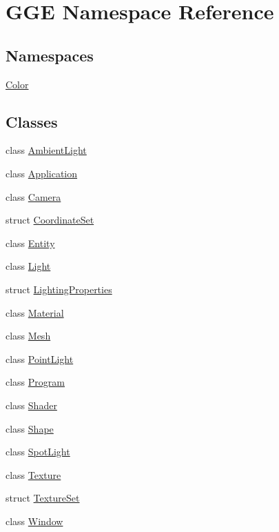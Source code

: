 \hypertarget{namespace_g_g_e}{\section{G\+G\+E Namespace Reference}
\label{namespace_g_g_e}
}
\subsection*{Namespaces}
\begin{DoxyCompactItemize}
\item 
 \hyperlink{namespace_g_g_e_1_1_color}{Color}
\end{DoxyCompactItemize}
\subsection*{Classes}
\begin{DoxyCompactItemize}
\item 
class \hyperlink{class_g_g_e_1_1_ambient_light}{Ambient\+Light}
\item 
class \hyperlink{class_g_g_e_1_1_application}{Application}
\item 
class \hyperlink{class_g_g_e_1_1_camera}{Camera}
\item 
struct \hyperlink{struct_g_g_e_1_1_coordinate_set}{Coordinate\+Set}
\item 
class \hyperlink{class_g_g_e_1_1_entity}{Entity}
\item 
class \hyperlink{class_g_g_e_1_1_light}{Light}
\item 
struct \hyperlink{struct_g_g_e_1_1_lighting_properties}{Lighting\+Properties}
\item 
class \hyperlink{class_g_g_e_1_1_material}{Material}
\item 
class \hyperlink{class_g_g_e_1_1_mesh}{Mesh}
\item 
class \hyperlink{class_g_g_e_1_1_point_light}{Point\+Light}
\item 
class \hyperlink{class_g_g_e_1_1_program}{Program}
\item 
class \hyperlink{class_g_g_e_1_1_shader}{Shader}
\item 
class \hyperlink{class_g_g_e_1_1_shape}{Shape}
\item 
class \hyperlink{class_g_g_e_1_1_spot_light}{Spot\+Light}
\item 
class \hyperlink{class_g_g_e_1_1_texture}{Texture}
\item 
struct \hyperlink{struct_g_g_e_1_1_texture_set}{Texture\+Set}
\item 
class \hyperlink{class_g_g_e_1_1_window}{Window}
\end{DoxyCompactItemize}
